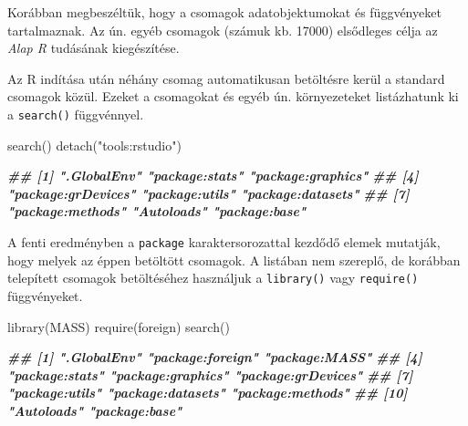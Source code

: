 \documentclass[
]{book}
\newenvironment{Shaded}{\begin{snugshade}}{\end{snugshade}}
\newcommand{\DocumentationTok}[1]{\textcolor[rgb]{0.56,0.35,0.01}{\textbf{\textit{#1}}}}
\newcommand{\FunctionTok}[1]{\textcolor[rgb]{0.00,0.00,0.00}{#1}}
\newcommand{\NormalTok}[1]{#1}
\newcommand{\StringTok}[1]{\textcolor[rgb]{0.31,0.60,0.02}{#1}}
\begin{document}
Korábban megbeszéltük, hogy a csomagok adatobjektumokat és függvényeket tartalmaznak. Az ún. egyéb csomagok (számuk kb. 17000) elsődleges célja az \emph{Alap R} tudásának kiegészítése.

Az R indítása után néhány csomag automatikusan betöltésre kerül a standard csomagok közül. Ezeket a csomagokat és egyéb ún. környezeteket listázhatunk ki a \texttt{search()} függvénnyel.

\begin{Shaded}
\begin{Highlighting}[]
\FunctionTok{search}\NormalTok{()}
\FunctionTok{detach}\NormalTok{(}\StringTok{"tools:rstudio"}\NormalTok{)}
\end{Highlighting}
\end{Shaded}

\begin{Shaded}
\begin{Highlighting}[]
\DocumentationTok{\#\# [1] ".GlobalEnv"        "package:stats"     "package:graphics" }
\DocumentationTok{\#\# [4] "package:grDevices" "package:utils"     "package:datasets" }
\DocumentationTok{\#\# [7] "package:methods"   "Autoloads"         "package:base"}
\end{Highlighting}
\end{Shaded}

A fenti eredményben a \texttt{package} karaktersorozattal kezdődő elemek mutatják, hogy melyek az éppen betöltött csomagok. A listában nem szereplő, de korábban telepített csomagok betöltéséhez használjuk a \texttt{library()} vagy \texttt{require()} függvényeket.

\begin{Shaded}
\begin{Highlighting}[]
\FunctionTok{library}\NormalTok{(MASS)}
\FunctionTok{require}\NormalTok{(foreign)}
\FunctionTok{search}\NormalTok{()}
\end{Highlighting}
\end{Shaded}

\begin{Shaded}
\begin{Highlighting}[]
\DocumentationTok{\#\#  [1] ".GlobalEnv"        "package:foreign"   "package:MASS"     }
\DocumentationTok{\#\#  [4] "package:stats"     "package:graphics"  "package:grDevices"}
\DocumentationTok{\#\#  [7] "package:utils"     "package:datasets"  "package:methods"  }
\DocumentationTok{\#\# [10] "Autoloads"         "package:base"  }
\end{Highlighting}
\end{Shaded}
\end{document}
